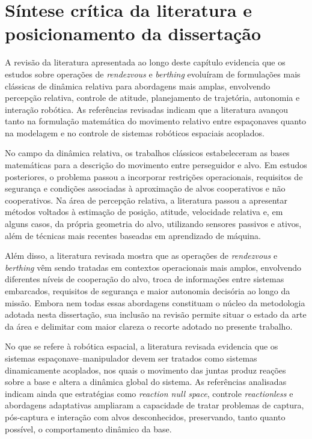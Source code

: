 \section{Síntese crítica da literatura e posicionamento da dissertação}
\label{sec_sintese_critica_posicionamento_dissertacao}

A revisão da literatura apresentada ao longo deste capítulo evidencia que os estudos sobre operações de \textit{rendezvous} e \textit{berthing} evoluíram de formulações mais clássicas de dinâmica relativa para abordagens mais amplas, envolvendo percepção relativa, controle de atitude, planejamento de trajetória, autonomia e interação robótica. As referências revisadas indicam que a literatura avançou tanto na formulação matemática do movimento relativo entre espaçonaves quanto na modelagem e no controle de sistemas robóticos espaciais acoplados.

No campo da dinâmica relativa, os trabalhos clássicos estabeleceram as bases matemáticas para a descrição do movimento entre perseguidor e alvo. Em estudos posteriores, o problema passou a incorporar restrições operacionais, requisitos de segurança e condições associadas à aproximação de alvos cooperativos e não cooperativos. Na área de percepção relativa, a literatura passou a apresentar métodos voltados à estimação de posição, atitude, velocidade relativa e, em alguns casos, da própria geometria do alvo, utilizando sensores passivos e ativos, além de técnicas mais recentes baseadas em aprendizado de máquina.

Além disso, a literatura revisada mostra que as operações de \textit{rendezvous} e \textit{berthing} vêm sendo tratadas em contextos operacionais mais amplos, envolvendo diferentes níveis de cooperação do alvo, troca de informações entre sistemas embarcados, requisitos de segurança e maior autonomia decisória ao longo da missão.
Embora nem todas essas abordagens constituam o núcleo da metodologia adotada nesta dissertação, sua inclusão na revisão permite situar o estado da arte da área e delimitar com maior clareza o recorte adotado no presente trabalho.

No que se refere à robótica espacial, a literatura revisada evidencia que os sistemas espaçonave--manipulador devem ser tratados como sistemas dinamicamente acoplados, nos quais o movimento das juntas produz reações sobre a base e altera a dinâmica global do sistema. As referências analisadas indicam ainda que estratégias como \textit{reaction null space}, controle \textit{reactionless} e abordagens adaptativas ampliaram a capacidade de tratar problemas de captura, pós-captura e interação com alvos desconhecidos, preservando, tanto quanto possível, o comportamento dinâmico da base.

